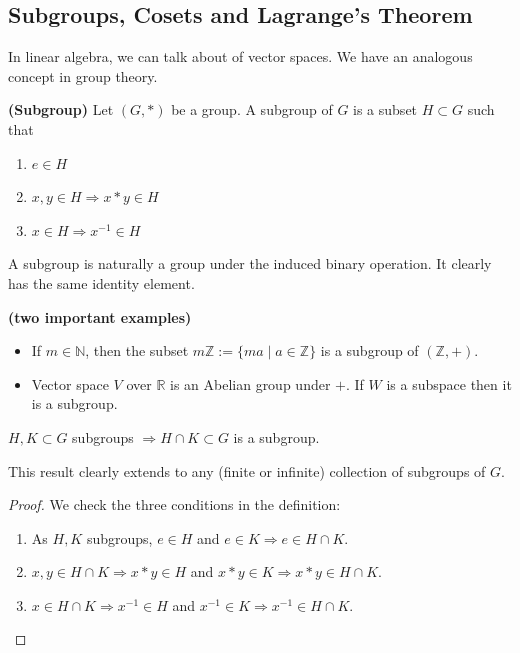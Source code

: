 \documentclass{article}
\newcommand{\bfs}[1]{\textbf{({#1}) }}
\begin{document}
\subsection{Subgroups, Cosets and Lagrange's Theorem}
In linear algebra, we can talk about  of vector spaces. We have an analogous concept in group theory.
\begin{defa}{\bfs{Subgroup}}
    Let $(G, *)$ be a group. A subgroup of $G$ is a subset $H \subset G$ such that
    \begin{enumerate}
        \item $e \in H$
        \item $x, y \in H \Rightarrow x * y \in H$
        \item  $x \in H \Rightarrow x^{-1} \in H$
    \end{enumerate}
\end{defa}
\begin{rema}
 A subgroup is naturally a group under the induced binary operation. It clearly has the same identity element.
\end{rema}
\begin{exma}{\bfs{two important examples}}
\label{exm:dofma}
\begin{itemize}
    \item If $m \in \mathbb{N}$, then the subset $m \mathbb{Z}:=\{m a \mid a \in \mathbb{Z}\}$ is a subgroup of $(\mathbb{Z},+)$.
    \item Vector space $V$  over $\mathbb{R}$ is an Abelian group under $+$. If $W$ is a subspace then it is a subgroup.
\end{itemize}
\end{exma} 
\begin{lema}
$H, K \subset G$ subgroups $\Rightarrow H \cap K \subset G$ is a subgroup.
\end{lema}
\begin{rema}
This result clearly extends to any (finite or infinite) collection of subgroups of $G$.
\end{rema}
\begin{proof}We check the three conditions in the definition:
\begin{enumerate}
    \item  As $H, K$ subgroups, $e \in H$ and $e \in K \Rightarrow e \in H \cap K$.
    \item $x, y \in H \cap K \Rightarrow x * y \in H$ and $x * y \in K \Rightarrow x * y \in H \cap K$.
    \item $x \in H \cap K \Rightarrow x^{-1} \in H$ and $x^{-1} \in K \Rightarrow x^{-1} \in H \cap K$.
\end{enumerate}
\end{proof} 
\end{document}
